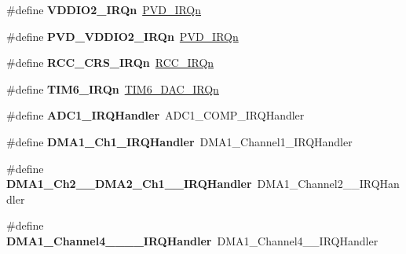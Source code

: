 \begin{DoxyCompactItemize}
\#define {\bfseries V\+D\+D\+I\+O2\+\_\+\+I\+R\+Qn}~\hyperlink{group___peripheral__interrupt__number__definition_gga7e1129cd8a196f4284d41db3e82ad5c8ab0b51ffcc4dcf5661141b79c8e5bd924}{P\+V\+D\+\_\+\+I\+R\+Qn}
\item 
\mbox{\label{group__stm32f051x8_ga6ee51c7fd35d5ddeadbff09df510e7fd}} 
\#define {\bfseries P\+V\+D\+\_\+\+V\+D\+D\+I\+O2\+\_\+\+I\+R\+Qn}~\hyperlink{group___peripheral__interrupt__number__definition_gga7e1129cd8a196f4284d41db3e82ad5c8ab0b51ffcc4dcf5661141b79c8e5bd924}{P\+V\+D\+\_\+\+I\+R\+Qn}
\item 
\mbox{\label{group__stm32f051x8_gae18a29b2efaaf8a767a2d11f7bf675f1}} 
\#define {\bfseries R\+C\+C\+\_\+\+C\+R\+S\+\_\+\+I\+R\+Qn}~\hyperlink{group___peripheral__interrupt__number__definition_gga7e1129cd8a196f4284d41db3e82ad5c8a5710b22392997bac63daa5c999730f77}{R\+C\+C\+\_\+\+I\+R\+Qn}
\item 
\mbox{\label{group__stm32f051x8_ga16b30b9f4d374c506d31c9d4c6cce8a1}} 
\#define {\bfseries T\+I\+M6\+\_\+\+I\+R\+Qn}~\hyperlink{group___peripheral__interrupt__number__definition_gga7e1129cd8a196f4284d41db3e82ad5c8a5f581e9aedfaccd9b1db9ec793804b45}{T\+I\+M6\+\_\+\+D\+A\+C\+\_\+\+I\+R\+Qn}
\item 
\mbox{\label{group__stm32f051x8_gacfad9f182b248bceb2ebedd9ae366546}} 
\#define {\bfseries A\+D\+C1\+\_\+\+I\+R\+Q\+Handler}~A\+D\+C1\+\_\+\+C\+O\+M\+P\+\_\+\+I\+R\+Q\+Handler
\item 
\mbox{\label{group__stm32f051x8_ga3f7debe9fc2548ab6640825967110101}} 
\#define {\bfseries D\+M\+A1\+\_\+\+Ch1\+\_\+\+I\+R\+Q\+Handler}~D\+M\+A1\+\_\+\+Channel1\+\_\+\+I\+R\+Q\+Handler
\item 
\mbox{\label{group__stm32f051x8_ga3752ab0b9a6635ccd7bc87b99ee8fd9b}} 
\#define {\bfseries D\+M\+A1\+\_\+\+Ch2\+\_\+\_\+\+D\+M\+A2\+\_\+\+Ch1\+\_\+\_\+\+I\+R\+Q\+Handler}~D\+M\+A1\+\_\+\+Channel2\+\_\+\_\+\+I\+R\+Q\+Handler
\item 
\mbox{\label{group__stm32f051x8_gae3db46ad17e9f800e0f88b489eed522d}} 
\#define {\bfseries D\+M\+A1\+\_\+\+Channel4\+\_\+\_\+\_\+\_\+\+I\+R\+Q\+Handler}~D\+M\+A1\+\_\+\+Channel4\+\_\+\_\+\+I\+R\+Q\+Handler

\end{DoxyCompactItemize}
